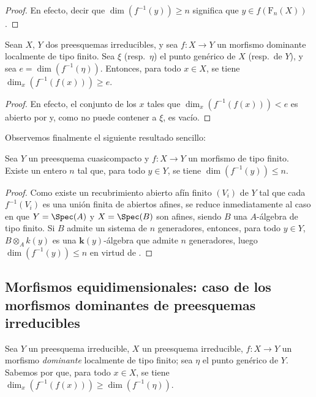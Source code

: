 \begin{proof}
En efecto, decir que $\dim(f^{-1}(y))\geq n$ significa que $y\in f(\mathrm{F}_n(X))$ .
\end{proof}

\begin{corollary}[13.1.6]
\label{IV.13.1.6}
Sean $X$, $Y$ dos preesquemas irreducibles, y sea $f:X\to Y$ un morfismo dominante localmente de tipo finito.
Sea $\xi$ (resp.\ $\eta$) el punto genérico de $X$ (resp.\ de $Y$), y sea $e=\dim(f^{-1}(\eta))$.
Entonces, para todo $x\in X$, se tiene $\dim_x(f^{-1}(f(x)))\geq e$.
\end{corollary}

\begin{proof}
En efecto, el conjunto de los $x$ tales que $\dim_x(f^{-1}(f(x)))<e$ es abierto por  y, como no puede contener a $\xi$, es vacío.
\end{proof}

Observemos finalmente el siguiente resultado sencillo:

\begin{proposition}[13.1.7]
\label{IV.13.1.7}
Sea $Y$ un preesquema cuasicompacto y $f:X\to Y$ un morfismo de tipo finito.
Existe un entero $n$ tal que, para todo $y\in Y$, se tiene $\dim(f^{-1}(y))\leq n$.
\end{proposition}

\begin{proof}
Como existe un recubrimiento abierto afín finito $(V_i)$ de $Y$ tal que cada $f^{-1}(V_i)$ es una unión finita de abiertos afines, se reduce inmediatamente al caso en que $Y=\Spec(A)$ y $X=\Spec(B)$ son afines, siendo $B$ una $A$-álgebra de tipo finito.
Si $B$ admite un sistema de $n$ generadores, entonces, para todo $y\in Y$, $B\otimes_A k(y)$ es una $\boldsymbol k(y)$-álgebra que admite $n$ generadores, luego $\dim(f^{-1}(y))\leq n$ en virtud de .
\end{proof}

\subsection{Morfismos equidimensionales: caso de los morfismos dominantes de preesquemas irreducibles}
\label{subsection:IV.13.2}

\begin{env}[13.2.1]
\label{IV.13.2.1}
Sea $Y$ un preesquema irreducible, $X$ un preesquema irreducible, $f:X\to Y$ un morfismo \emph{dominante} localmente de tipo finito; sea $\eta$ el punto genérico de $Y$.
Sabemos por  que, para todo $x\in X$, se tiene $\dim_x(f^{-1}(f(x)))\geq\dim(f^{-1}(\eta))$.
\end{env}

